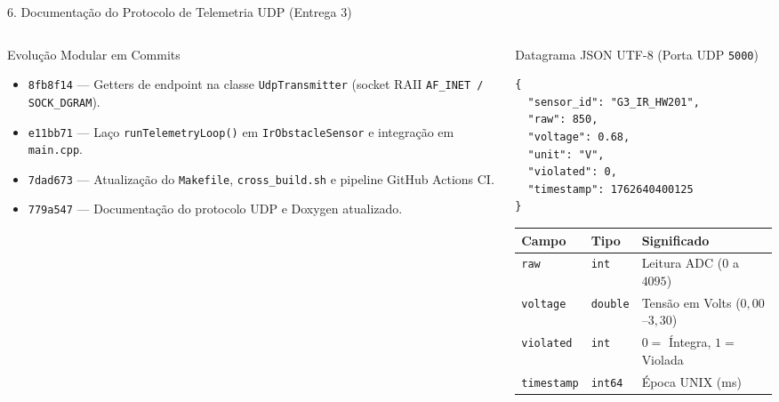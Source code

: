 \documentclass[aspectratio=169,10pt]{beamer}
\begin{document}
\begin{frame}[fragile]{6. Documenta\c{c}\~{a}o do Protocolo de Telemetria UDP (Entrega 3)}
  \begin{columns}[T,onlytextwidth]
    \begin{column}{0.50\textwidth}
      \begin{block}{Evolu\c{c}\~{a}o Modular em Commits}
        \begin{itemize}
          \item \texttt{8fb8f14} --- Getters de endpoint na classe \texttt{UdpTransmitter} (socket RAII \texttt{AF\_INET / SOCK\_DGRAM}).
          \item \texttt{e11bb71} --- La\c{c}o \texttt{runTelemetryLoop()} em \texttt{IrObstacleSensor} e integra\c{c}\~{a}o em \texttt{main.cpp}.
          \item \texttt{7dad673} --- Atualiza\c{c}\~{a}o do \texttt{Makefile}, \texttt{cross\_build.sh} e pipeline GitHub Actions CI.
          \item \texttt{779a547} --- Documenta\c{c}\~{a}o do protocolo UDP e Doxygen atualizado.
        \end{itemize}
      \end{block}
    \end{column}

    \begin{column}{0.47\textwidth}
      \begin{block}{Datagrama JSON UTF-8 (Porta UDP \texttt{5000})}
\begin{lstlisting}
{
  "sensor_id": "G3_IR_HW201",
  "raw": 850,
  "voltage": 0.68,
  "unit": "V",
  "violated": 0,
  "timestamp": 1762640400125
}
\end{lstlisting}
      \end{block}
      \scriptsize
      \begin{tabular}{lll}
        \toprule
        \textbf{Campo} & \textbf{Tipo} & \textbf{Significado} \\
        \midrule
        \texttt{raw} & \texttt{int} & Leitura ADC ($0$ a $4095$) \\
        \texttt{voltage} & \texttt{double} & Tens\~{a}o em Volts ($0{,}00$--$3{,}30$) \\
        \texttt{violated} & \texttt{int} & $0=$ \'{I}ntegra, $1=$ Violada \\
        \texttt{timestamp} & \texttt{int64} & \'{E}poca UNIX (ms) \\
        \bottomrule
      \end{tabular}
    \end{column}
  \end{columns}
\end{frame}
\end{document}
